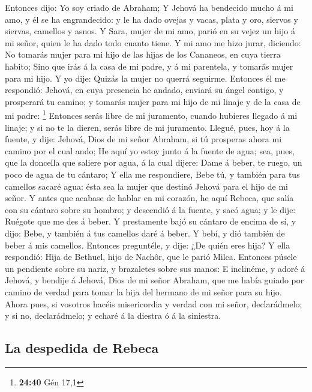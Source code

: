  Entonces dijo: Yo soy criado de Abraham;  Y
Jehová ha bendecido mucho á mi amo, y él se ha engrandecido: y le ha
dado ovejas y vacas, plata y oro, siervos y siervas, camellos y asnos.
 Y Sara, mujer de mi amo, parió en su vejez un hijo á mi
señor, quien le ha dado todo cuanto tiene.  Y mi amo me
hizo jurar, diciendo: No tomarás mujer para mi hijo de las hijas de los
Cananeos, en cuya tierra habito;  Sino que irás á la casa
de mi padre, y á mi parentela, y tomarás mujer para mi hijo.
 Y yo dije: Quizás la mujer no querrá seguirme.
 Entonces él me respondió: Jehová, en cuya presencia he
andado, enviará su ángel contigo, y prosperará tu camino; y tomarás
mujer para mi hijo de mi linaje y de la casa de mi padre: \footnote{\textbf{24:40}
  Gén 17,1}  Entonces serás libre de mi juramento, cuando
hubieres llegado á mi linaje; y si no te la dieren, serás libre de mi
juramento.  Llegué, pues, hoy á la fuente, y dije: Jehová,
Dios de mi señor Abraham, si tú prosperas ahora mi camino por el cual
ando;  He aquí yo estoy junto á la fuente de agua; sea,
pues, que la doncella que saliere por agua, á la cual dijere: Dame á
beber, te ruego, un poco de agua de tu cántaro;  Y ella me
respondiere, Bebe tú, y también para tus camellos sacaré agua: ésta sea
la mujer que destinó Jehová para el hijo de mi señor.  Y
antes que acabase de hablar en mi corazón, he aquí Rebeca, que salía con
su cántaro sobre su hombro; y descendió á la fuente, y sacó agua; y le
dije: Ruégote que me des á beber.  Y prestamente bajó su
cántaro de encima de sí, y dijo: Bebe, y también á tus camellos daré á
beber. Y bebí, y dió también de beber á mis camellos. 
Entonces preguntéle, y dije: ¿De quién eres hija? Y ella respondió: Hija
de Bethuel, hijo de Nachôr, que le parió Milca. Entonces púsele un
pendiente sobre su nariz, y brazaletes sobre sus manos:  E
inclinéme, y adoré á Jehová, y bendije á Jehová, Dios de mi señor
Abraham, que me había guiado por camino de verdad para tomar la hija del
hermano de mi señor para su hijo.  Ahora pues, si vosotros
hacéis misericordia y verdad con mi señor, declarádmelo; y si no,
declarádmelo; y echaré á la diestra ó á la siniestra.

\hypertarget{la-despedida-de-rebeca}{%
\subsection{La despedida de Rebeca}\label{la-despedida-de-rebeca}}

